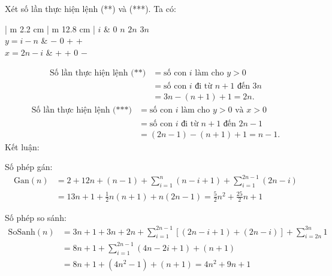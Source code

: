 \documentclass[12pt, a4paper, fleqn]{article}
\begin{document}
	Xét số lần thực hiện lệnh (**) và (***). Ta có:
	\begin{center}
		\begin{tabular}{ | m {2.2 cm} | m {12.8 cm} | } 
			\hline
			\hspace*{25pt} $i$ & 0 \hspace*{105pt} $n$ \hspace*{105pt} $2n$ \hspace*{90pt} $3n$ \\
			\hspace*{2pt} $y = i - n$ & \hspace*{49pt} $-$ \hspace*{49pt} 0 \hspace*{50pt} + \hspace*{100pt} + \\
			\hspace*{1pt} $x = 2n - i$ & \hspace*{49pt} + \hspace*{114pt} + \hspace*{40pt} 0 \hspace*{45pt} $-$ \\
			\hline
		\end{tabular}
	\end{center}
	\begin{align*}
	\text{Số lần thực hiện lệnh (**)} &= \text{số con $i$ làm cho $y > 0$} \\
							   		  &= \text{số con $i$ đi từ $n + 1$ đến $3n$} \\
								   	  &= 3n - (n + 1) + 1 = 2n.
	\end{align*}
	\begin{align*}
	\text{Số lần thực hiện lệnh (***)} &= \text{số con $i$ làm cho $y > 0$ và $x > 0$} \\
									   &= \text{số con $i$ đi từ $n + 1$ đến $2n - 1$} \\
									   &= (2n - 1) - (n + 1) + 1 = n - 1.
	\end{align*}
	Kết luận:
	
	Số phép gán:
	\begin{align*}
	\text{Gan}(n) &= 2 + 12n + (n - 1) + \sum_{i = 1}^{n} (n - i + 1) + \sum_{i = 1}^{2n - 1} (2n - i) \\
				  &= 13n + 1 + \frac{1}{2} n(n + 1) + n(2n - 1) = \frac{5}{2}n^2 + \frac{25}{2}n + 1
	\end{align*}
	
	Số phép so sánh:
	\begin{align*}
	\text{SoSanh}(n) &= 3n + 1 + 3n + 2n + \sum_{i = 1}^{2n - 1} [(2n - i + 1) + (2n - i)] + \sum_{i = 2n}^{3n} 1 \\
					 &= 8n + 1 + \sum_{i = 1}^{2n - 1} (4n - 2i + 1) + (n + 1) \\
					 &= 8n + 1 + (4n^2 - 1) + (n + 1) = 4n^2 + 9n + 1
	\end{align*}
	
\end{document}
